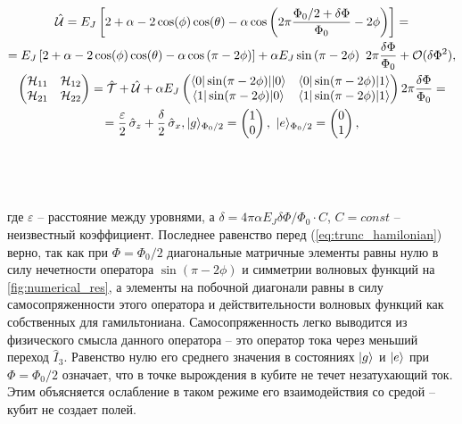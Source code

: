 \documentclass[12pt]{article}
\DeclarePairedDelimiter\bra{\langle}{\rvert}
\DeclarePairedDelimiter\ket{\lvert}{\rangle}
\newcommand{\rbrkt}[1]{\left( #1 \right)}
\numberwithin{equation}{section}
\begin{document}
\begin{gather}
\hat{\mathcal{U}} = E_J\left[2+\alpha - 2\cos(\phi)\cos(\theta) - \alpha\cos\left(2\pi\frac{\Phi_0/2+\delta\Phi}{\Phi_0} -2\phi \right)\right] = \notag \\
= E_J\left[2+\alpha - 2\cos(\phi)\cos(\theta) - \alpha\cos\left(\pi - 2\phi \right)\right] + \alpha E_J\sin\left(\pi - 2\phi\right)\ 2\pi\frac{\delta\Phi}{\Phi_0} + \mathcal{O}(\delta\Phi^2), \notag \\
\left(\begin{matrix}
\mathcal{H}_{11} & \mathcal{H}_{12} \\
\mathcal{H}_{21} & \mathcal{H}_{22}
\end{matrix}\right) = 
\hat{\mathcal{T}} + \hat{\mathcal{U}} + \alpha E_J 	
\left(\begin{matrix}
\bra{0}\sin(\pi - 2\phi)|\ket{0} & \bra{0}\sin(\pi - 2\phi)\ket{1}\\
\bra{1}\sin(\pi - 2\phi)\ket{0} &\bra{1}\sin(\pi - 2\phi)\ket{1}
\end{matrix}\right)2\pi\frac{\delta\Phi}{\Phi_0} = \notag \\  \vspace{50pt}
= \frac{\varepsilon}{2}\,\hat\sigma_z + \frac{\delta}{2}\,\hat\sigma_x ,\ket{g}_{\Phi_0/2}=\rbrkt{\begin{matrix}
1\\0\end{matrix}},\ \ket{e}_{\Phi_0/2}=\rbrkt{\begin{matrix}
0\\1\end{matrix}},
\label{eq:trunc_hamilonian}
\end{gather}
где $\varepsilon$ -- расстояние между уровнями, а $\delta = 4\pi\alpha E_J \delta\Phi/\Phi_0 \cdot C$, $C=const$ -- неизвестный
 коэффициент. Последнее равенство перед (\ref{eq:trunc_hamilonian}) верно, так как при $\Phi = \Phi_0/2$ диагональные матричные элементы равны нулю в силу нечетности оператора $\sin(\pi - 2\phi)$ и симметрии волновых функций на \autoref{fig:numerical_res}, а элементы на побочной диагонали равны в силу самосопряженности этого оператора и действительности волновых функций как собственных для гамильтониана. Самосопряженность легко выводится из физического смысла данного оператора -- это оператор тока через меньший переход $\hat{I}_3$. Равенство нулю его среднего значения в состояниях $\ket{g}$ и $\ket{e}$ при $\Phi = \Phi_0/2$ означает, что в точке вырождения в кубите не течет незатухающий ток. Этим объясняется ослабление в таком режиме его взаимодействия со средой -- кубит не создает полей.
\end{document}
